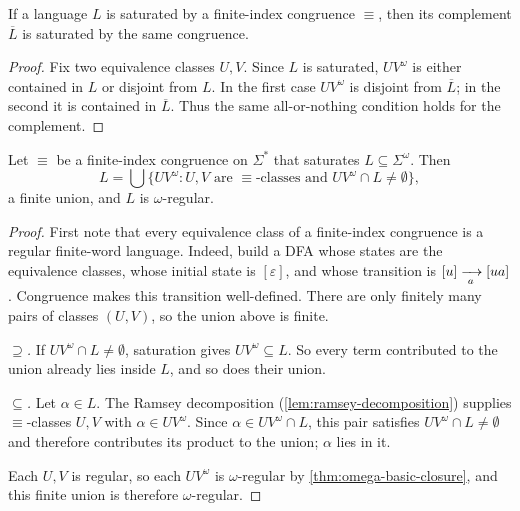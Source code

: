 \begin{proposition}
\label{prop:saturation-complement}
If a language $L$ is saturated by a finite-index congruence $\equiv$,
then its complement $\overline{L}$ is saturated by the same congruence.
\end{proposition}

\begin{proof}
Fix two equivalence classes $U,V$.  Since $L$ is saturated,
$UV^\omega$ is either contained in $L$ or disjoint from $L$.  In the
first case $UV^\omega$ is disjoint from $\overline{L}$; in the second it
is contained in $\overline{L}$.  Thus the same all-or-nothing condition
holds for the complement.
\end{proof}

\begin{lemma}
\label{lem:complement-from-saturation}
Let $\equiv$ be a finite-index congruence on $\Sigma^*$ that saturates
$L\subseteq\Sigma^\omega$.  Then
\[
  L = \bigcup\{UV^\omega : U,V \text{ are } \equiv\text{-classes and } UV^\omega\cap L\neq\emptyset\},
\]
a finite union, and $L$ is $\omega$-regular.
\end{lemma}

\begin{proof}
First note that every equivalence class of a finite-index congruence is
a regular finite-word language.  Indeed, build a DFA whose states are
the equivalence classes, whose initial state is $[\varepsilon]$, and
whose transition is $[u]\xrightarrow[{\;a\;}]{}[ua]$.  Congruence makes this
transition well-defined.  There are only finitely many pairs of
classes $(U,V)$, so the union above is finite.

\emph{$\supseteq$.}  If $UV^\omega\cap L\neq\emptyset$, saturation gives
$UV^\omega\subseteq L$.  So every term contributed to the union already
lies inside $L$, and so does their union.

\emph{$\subseteq$.}  Let $\alpha\in L$.  The Ramsey decomposition
(\cref{lem:ramsey-decomposition}) supplies $\equiv$-classes $U,V$ with
$\alpha\in UV^\omega$.  Since $\alpha\in UV^\omega\cap L$, this pair
satisfies $UV^\omega\cap L\neq\emptyset$ and therefore contributes its
product to the union; $\alpha$ lies in it.

Each $U,V$ is regular, so each $UV^\omega$ is $\omega$-regular by
\cref{thm:omega-basic-closure}, and this finite union is therefore
$\omega$-regular.
\end{proof}

